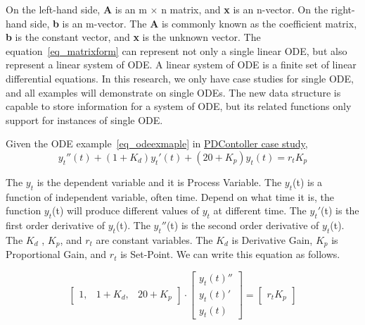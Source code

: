 On the left-hand side, \textbf{A} is an m $\times$ n matrix, and \textbf{x} is an n-vector. On the right-hand side, \textbf{b} is an m-vector. The \textbf{A} is commonly known as the coefficient matrix, \textbf{b} is the constant vector, and \textbf{x} is the unknown vector. The equation~\ref{eq_matrixform} can represent not only a single linear ODE, but also represent a linear system of ODE. A linear system of ODE is a finite set of linear differential equations. In this research, we only have case studies for single ODE, and all examples will demonstrate on single ODEs. The new data structure is capable to store information for a system of ODE, but its related functions only support for instances of single ODE.

Given the ODE example~\ref{eq_odeexmaple} in \href{https://jacquescarette.github.io/Drasil/examples/pdcontroller/SRS/srs/PDController_SRS.html}{PDContoller case study},
\begin{equation} \label{eq_odeexmaple}
	y_t''(t) + (1 + K_d)y_t'(t) + (20 + K_p)y_t(t) = r_t K_p
\end{equation}

The $y_t$ is the dependent variable and it is Process Variable. The $y_t$(t) is a function of independent variable, often time. Depend on what time it is, the function $y_t$(t) will produce different values of $y_t$ at different time. The $y_t'$(t) is the first order derivative of $y_t$(t). The $y_t''$(t) is the second order derivative of $y_t$(t). The $K_d$ , $K_p$, and $r_t$ are constant variables. The $K_d$ is Derivative Gain, $K_p$ is Proportional Gain, and $r_t$ is Set-Point. We can write this equation as follows. 

\begin{equation} \label{eq_matrixformexmaple}
	\begin{bmatrix}
		1, & 1 + K_{d}, & 20 + K_{p}
	\end{bmatrix}
	\cdot
	\begin{bmatrix}
		y_{t}(t)''  \\
		y_{t}(t)'   \\
		y_{t}(t)  
	\end{bmatrix}
	=
	\begin{bmatrix}
		r_{t} K_{p} 
	\end{bmatrix}
\end{equation}

